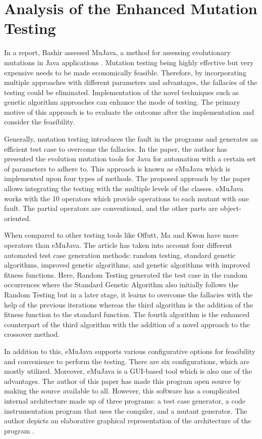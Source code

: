 \section{Analysis of the Enhanced Mutation Testing}
In a report, Bashir assessed MuJava, a method for assessing evolutionary mutations in Java applications \cite{ref34}. Mutation testing being highly effective but very expensive needs to be made economically feasible. Therefore, by incorporating multiple approaches with different parameters and advantages, the fallacies of the testing could be eliminated. Implementation of the novel techniques such as genetic algorithm approaches can enhance the mode of testing. The primary motive of this approach is to evaluate the outcome after the implementation and consider the feasibility. \par 
Generally, mutation testing introduces the fault in the programs and generates an efficient test case to overcome the fallacies. In the paper, the author has presented the evolution mutation tools for Java for automation with a certain set of parameters to adhere to. This approach is known as eMuJava which is implemented upon four types of methods. The proposed approach by the paper allows integrating the testing with the multiple levels of the classes. eMuJava works with the 10 operators which provide operations to each mutant with one fault. The partial operators are conventional, and the other parts are object-oriented.\par 
When compared to other testing tools like Offutt, Ma and Kwon have more operators than eMuJava. The article has taken into account four different automated test case generation methods: random testing, standard genetic algorithms, improved genetic algorithms, and genetic algorithms with improved fitness functions. Here, Random Testing generated the test case in the random occurrences where the Standard Genetic Algorithm also initially follows the Random Testing but in a later stage, it learns to overcome the fallacies with the help of the previous iterations whereas the third algorithm is the addition of the fitness function to the standard function. The fourth algorithm is the enhanced counterpart of the third algorithm with the addition of a novel approach to the crossover method.\par 
In addition to this, eMuJava supports various configurative options for feasibility and convenience to perform the testing. There are six configurations, which are mostly utilized. Moreover, eMuJava is a GUI-based tool which is also one of the advantages. The author of this paper has made this program open source by making the source available to all. However, this software has a complicated internal architecture made up of three programs: a test case generator, a code instrumentation program that uses the compiler, and a mutant generator. The author depicts an elaborative graphical representation of the architecture of the program \cite{ref35}. \par 
